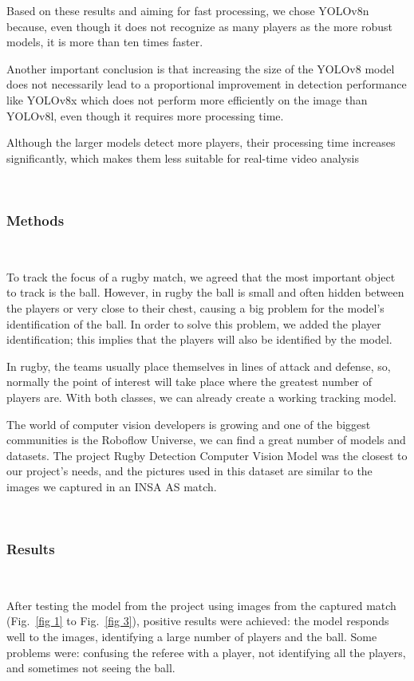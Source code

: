 \documentclass[conference]{IEEEtran}
\begin{document}
Based on these results and aiming for fast processing, we chose YOLOv8n because, even though it does not recognize as many players as the more robust models, it is more than ten times faster.

Another important conclusion is that increasing the size of the YOLOv8 model does not necessarily lead to a proportional improvement in detection performance like YOLOv8x which does not perform more efficiently on the image than YOLOv8l, even though it requires more processing time.

Although the larger models detect more players, their processing time increases significantly, which makes them less suitable for real-time video analysis

\
\subsubsection{Methods}\


To track the focus of a rugby match, we agreed that the most important object to track is the ball. However, in rugby the ball is small and often hidden between the players or very close to their chest, causing a big problem for the model's identification of the ball. In order to solve this problem, we added the player identification; this implies that the players will also be identified by the model.  

In rugby, the teams usually place themselves in lines of attack and defense, so, normally the point of interest will take place where the greatest number of players are. With both classes, we can already create a working tracking model. 

The world of computer vision developers is growing and one of the biggest communities is the Roboflow Universe, we can find a great number of models and datasets. The project Rugby Detection Computer Vision Model  \cite{rugby_ruck_detection}  was the closest to our project’s needs, and the pictures used in this dataset are similar to the images we captured in an INSA AS match.

\
\subsubsection{Results}\


After testing the model from the project \cite{rugby_ruck_detection} using images from the captured match (Fig.~\ref{fig 1} to Fig.~\ref{fig 3}), positive results were achieved: the model responds well to the images, identifying a large number of players and the ball. Some problems were: confusing the referee with a player, not identifying all the players, and sometimes not seeing the ball.  
\end{document}
